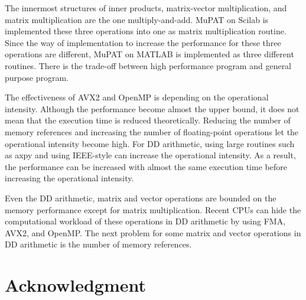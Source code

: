 \documentclass{IOS-Book-Article}
\begin{document}
The innermost structures of inner products, matrix-vector multiplication, and matrix multiplication are the one multiply-and-add. MuPAT on Scilab is implemented these three operations into one as matrix multiplication routine. Since the way of implementation to increase the performance for these three operations are different, MuPAT on MATLAB is implemented as three different routines. There is the trade-off between high performance program and general purpose program.

The effectiveness of AVX2 and OpenMP is depending on the operational intensity. 
Although the performance become almost the upper bound, it does not mean that the execution time is reduced theoretically. Reducing the number of memory references and increasing the number of floating-point operations let the operational intensity become high. For DD arithmetic, using large routines such as axpy and using IEEE-style can increase the operational intensity. As a result, the performance can be increased with almost the same execution time before increasing the operational intensity. 

Even the DD arithmetic, matrix and vector operations are bounded on the memory performance except for matrix multiplication. Recent CPUs can hide the computational workload of these operations in DD arithmetic by using FMA, AVX2, and OpenMP. The next problem for some matrix and vector operations in DD arithmetic is the number of memory references. 

\section*{Acknowledgment}
\end{document}
